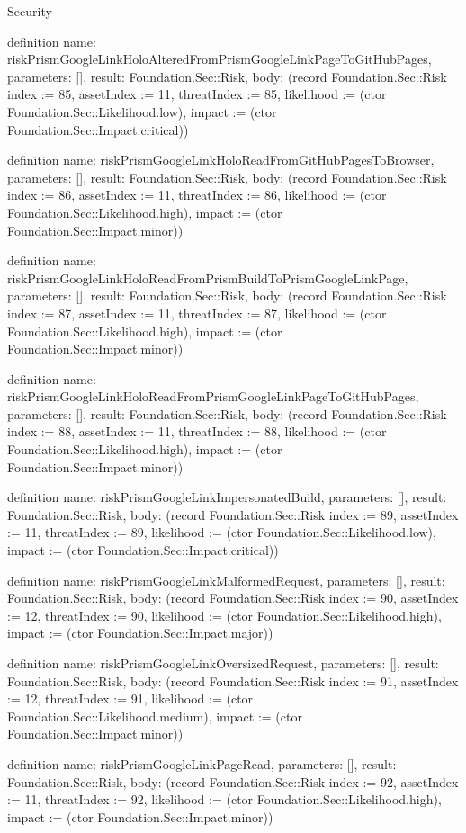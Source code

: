 \begin{lexlean}{Security}
\begin{semanticmodule}
definition{
  name: riskPrismGoogleLinkHoloAlteredFromPrismGoogleLinkPageToGitHubPages,
  parameters: [],
  result: Foundation.Sec::Risk,
  body: (record Foundation.Sec::Risk {index := 85, assetIndex := 11, threatIndex := 85, likelihood := (ctor Foundation.Sec::Likelihood.low), impact := (ctor Foundation.Sec::Impact.critical)})
}

definition{
  name: riskPrismGoogleLinkHoloReadFromGitHubPagesToBrowser,
  parameters: [],
  result: Foundation.Sec::Risk,
  body: (record Foundation.Sec::Risk {index := 86, assetIndex := 11, threatIndex := 86, likelihood := (ctor Foundation.Sec::Likelihood.high), impact := (ctor Foundation.Sec::Impact.minor)})
}

definition{
  name: riskPrismGoogleLinkHoloReadFromPrismBuildToPrismGoogleLinkPage,
  parameters: [],
  result: Foundation.Sec::Risk,
  body: (record Foundation.Sec::Risk {index := 87, assetIndex := 11, threatIndex := 87, likelihood := (ctor Foundation.Sec::Likelihood.high), impact := (ctor Foundation.Sec::Impact.minor)})
}

definition{
  name: riskPrismGoogleLinkHoloReadFromPrismGoogleLinkPageToGitHubPages,
  parameters: [],
  result: Foundation.Sec::Risk,
  body: (record Foundation.Sec::Risk {index := 88, assetIndex := 11, threatIndex := 88, likelihood := (ctor Foundation.Sec::Likelihood.high), impact := (ctor Foundation.Sec::Impact.minor)})
}

definition{
  name: riskPrismGoogleLinkImpersonatedBuild,
  parameters: [],
  result: Foundation.Sec::Risk,
  body: (record Foundation.Sec::Risk {index := 89, assetIndex := 11, threatIndex := 89, likelihood := (ctor Foundation.Sec::Likelihood.low), impact := (ctor Foundation.Sec::Impact.critical)})
}

definition{
  name: riskPrismGoogleLinkMalformedRequest,
  parameters: [],
  result: Foundation.Sec::Risk,
  body: (record Foundation.Sec::Risk {index := 90, assetIndex := 12, threatIndex := 90, likelihood := (ctor Foundation.Sec::Likelihood.high), impact := (ctor Foundation.Sec::Impact.major)})
}

definition{
  name: riskPrismGoogleLinkOversizedRequest,
  parameters: [],
  result: Foundation.Sec::Risk,
  body: (record Foundation.Sec::Risk {index := 91, assetIndex := 12, threatIndex := 91, likelihood := (ctor Foundation.Sec::Likelihood.medium), impact := (ctor Foundation.Sec::Impact.minor)})
}

definition{
  name: riskPrismGoogleLinkPageRead,
  parameters: [],
  result: Foundation.Sec::Risk,
  body: (record Foundation.Sec::Risk {index := 92, assetIndex := 11, threatIndex := 92, likelihood := (ctor Foundation.Sec::Likelihood.high), impact := (ctor Foundation.Sec::Impact.minor)})
}


\end{semanticmodule}
\end{lexlean}
